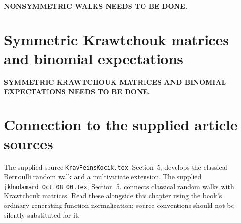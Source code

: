 \noindent\textbf{NONSYMMETRIC WALKS NEEDS TO BE DONE.}


\section{Symmetric Krawtchouk matrices and binomial expectations}
\label{sec:2-4}

\noindent\textbf{SYMMETRIC KRAWTCHOUK MATRICES AND BINOMIAL EXPECTATIONS NEEDS TO BE DONE.}



\section*{Connection to the supplied article sources}
The supplied source \texttt{KravFeinsKocik.tex}, Section~5, develops the
classical Bernoulli random walk and a multivariate extension.
The supplied \texttt{jkhadamard\_Oct\_08\_00.tex}, Section~5, connects
classical random walks with Krawtchouk matrices. Read these alongside
this chapter using the book's ordinary generating-function normalization;
source conventions should not be silently substituted for it.
